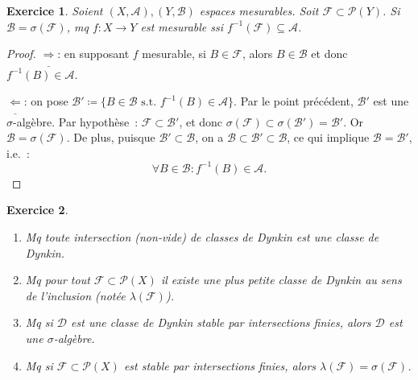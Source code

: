 \documentclass{article}
\newtheorem{ex}{Exercice}[section]
\theoremstyle{definition}
\newcommand{\st}{\text{ s.t. }}
\begin{document}
\begin{ex} Soient $(X, \mathcal A), (Y, \mathcal B)$ espaces mesurables. Soit $\mathcal F \subset \mathcal P(Y)$. Si $\mathcal B = \sigma(\mathcal F)$, mq $f : X \to Y$
est mesurable ssi $f^{-1}(\mathcal F) \subseteq \mathcal A$.
\end{ex}

\begin{proof} $\underline \Rightarrow$: en supposant $f$ mesurable, si $B \in \mathcal F$, alors $B \in \mathcal B$ et donc $f^{-1}(B) \in \mathcal A$.

$\underline \Leftarrow$: on pose $\mathcal B' \coloneqq \{B \in \mathcal B \st f^{-1}(B) \in \mathcal A\}$. Par le point précédent, $\mathcal B'$ est une $\sigma$-algèbre.
Par hypothèse~: $\mathcal F \subset \mathcal B'$, et donc $\sigma(\mathcal F) \subset \sigma(\mathcal B') = \mathcal B'$. Or $\mathcal B = \sigma(\mathcal F)$. De plus,
puisque $\mathcal B' \subset \mathcal B$, on a $\mathcal B \subset \mathcal B' \subset \mathcal B$, ce qui implique $\mathcal B = \mathcal B'$, i.e.~:
\[\forall B \in \mathcal B : f^{-1}(B) \in \mathcal A.\]
\end{proof}

\begin{ex}\label{ex:1.5}~
\begin{enumerate}
	\item Mq toute intersection (non-vide) de classes de Dynkin est une classe de Dynkin.
	\item Mq pour tout $\mathcal F \subset \mathcal P(X)$ il existe une plus petite classe de Dynkin au sens de l'inclusion (notée $\lambda(\mathcal F)$).
	\item Mq si $\mathcal D$ est une classe de Dynkin stable par intersections finies, alors $\mathcal D$ est une $\sigma$-algèbre.
	\item Mq si $\mathcal F \subset \mathcal P(X)$ est stable par intersections finies, alors $\lambda(\mathcal F) = \sigma(\mathcal F)$.
\end{enumerate}
\end{ex}
\end{document}
